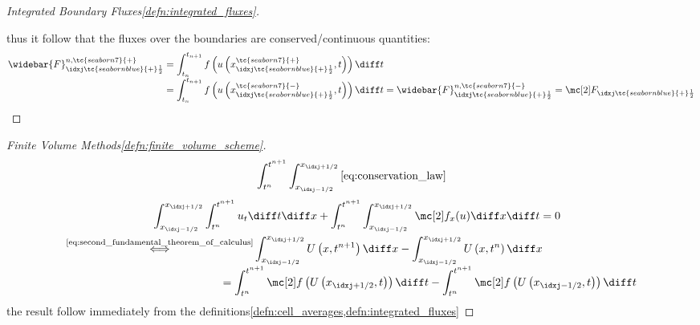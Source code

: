 \begin{proofbox}
\begin{proof}[Integrated Boundary Fluxes\cref{defn:integrated_fluxes}]
\begin{itemizenosep}
        \end{itemizenosep}
        thus it follow that the fluxes over the boundaries are conserved/continuous quantities:
        \begin{align}
          \widebar{F}_{\idxj\tc{seabornblue}{+}\frac{1}{2}}^{n,\tc{seaborn7}{+}}
          &=\int_{t_{n}}^{t_{n+1}}f \left(u\left(x_{\idxj\tc{seabornblue}{+}\frac{1}{2}}^{\tc{seaborn7}{+}},t\right)\right)\diff t \\[-1\jot]
          &=\int_{t_{n}}^{t_{n+1}}f \left(u\left(x_{\idxj\tc{seabornblue}{+}\frac{1}{2}}^{\tc{seaborn7}{-}},t\right)\right)\diff t
          =\widebar{F}_{\idxj\tc{seabornblue}{+}\frac{1}{2}}^{n,\tc{seaborn7}{-}}
          =\Flux_{\idxj\tc{seabornblue}{+}\frac{1}{2}}
        \end{align}
    \end{proof}
\end{proofbox}
\begin{proofbox}\nospacing
    \begin{proof}[Finite Volume Methods\cref{defn:finite_volume_scheme}]\label{proof:defn:finite_volume_scheme}
        \begin{align*}
          \int_{t^{n}}^{t^{n+1}}\int_{x_{\idxj-1/2}}^{x_{\idxj+1/2}}\text{\cref{eq:conservation_law}}
        \end{align*}
        \begin{align*}
          &&\int_{x_{\idxj-1/2}}^{x_{\idxj+1/2}}\int_{t^{n}}^{t^{n+1}}u_{t}\diff t\diff x+\int_{t^{n}}^{t^{n+1}}\int_{x_{\idxj-1/2}}^{x_{\idxj+1/2}}\flux_{x}(u)\diff x\diff t=0 \\[-1\jot]
        \end{align*}
        \begin{align*}
          \stackrel{\text{\cref{eq:second_fundamental_theorem_of_calculus}}}{\iff}&
          \int_{x_{\idxj-1/2}}^{x_{\idxj+1/2}}U\left(x,t^{n+1}\right)\diff x-\int_{x_{\idxj-1/2}}^{x_{\idxj+1/2}}U\left(x,t^{n}\right)\diff x \\[-1\jot]
          &\hspace{-3em}=\int_{t^{n}}^{t^{n+1}}\flux\left(U \left(x_{\idxj+1/2},t\right)\right)\diff t-\int_{t^{n}}^{t^{n+1}}\flux\left(U \left(x_{\idxj-1/2},t\right)\right)\diff t
        \end{align*}
        the result follow immediately from the definitions\cref{defn:cell_averages,defn:integrated_fluxes}
    \end{proof}
\end{proofbox}
